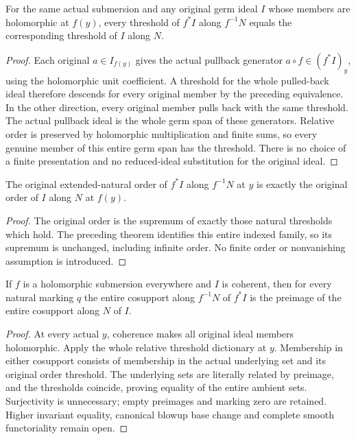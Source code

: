 \begin{theorem}
\label{hir:smooth-relative-whole-ideal-thresholds}
\leanok
For the same actual submersion and any original germ ideal $I$ whose
members are holomorphic at $f(y)$, every threshold of $f^*I$ along
$f^{-1}N$ equals the corresponding threshold of $I$ along $N$.
\end{theorem}
\begin{proof}
Each original $a\in I_{f(y)}$ gives the actual pullback generator
$a\circ f\in(f^*I)_y$, using the holomorphic unit coefficient. A
threshold for the whole pulled-back ideal therefore descends for every
original member by the preceding equivalence. In the other direction,
every original member pulls back with the same threshold. The actual
pullback ideal is the whole germ span of these generators. Relative
order is preserved by holomorphic multiplication and finite sums, so
every genuine member of this entire germ span has the threshold.
There is no choice of a finite presentation and no reduced-ideal
substitution for the original ideal.
\end{proof}

\begin{theorem}
\label{hir:smooth-relative-extended-order}
\leanok
The original extended-natural order of $f^*I$ along $f^{-1}N$ at $y$
is exactly the original order of $I$ along $N$ at $f(y)$.
\end{theorem}
\begin{proof}
The original order is the supremum of exactly those natural thresholds
which hold. The preceding theorem identifies this entire indexed family,
so its supremum is unchanged, including infinite order. No finite order
or nonvanishing assumption is introduced.
\end{proof}

\begin{theorem}
\label{hir:smooth-relative-whole-cosupport}
\leanok
If $f$ is a holomorphic submersion everywhere and $I$ is coherent, then
for every natural marking $q$ the entire cosupport along $f^{-1}N$
of $f^*I$ is the preimage of the entire cosupport along $N$ of $I$.
\end{theorem}
\begin{proof}
At every actual $y$, coherence makes all original ideal members
holomorphic. Apply the whole relative threshold dictionary at $y$.
Membership in either cosupport consists of membership in the actual
underlying set and its original order threshold. The underlying sets
are literally related by preimage, and the thresholds coincide, proving
equality of the entire ambient sets. Surjectivity is unnecessary; empty
preimages and marking zero are retained. Higher invariant equality,
canonical blowup base change and complete smooth functoriality remain
open.
\end{proof}

